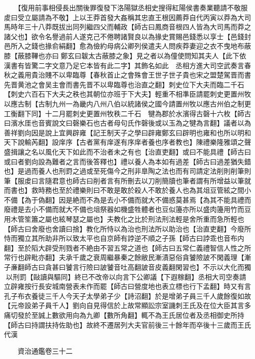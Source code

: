 　　【復用前事相侵長出關後罪復發下洛陽獄丞相史搜得紅陽侯書奏業聽請不敬服䖍曰受立屬請為不敬】上以王莽首發大姦稱其忠直王根因薦莽自代丙寅以莽為大司馬時年三十八莽既拔出同列繼四父而輔政【師古曰鳳商音根四人皆為大司馬而莽之諸父也】欲令名譽過前人遂克己不倦聘諸賢良以為掾史賞賜邑錢悉以享士【邑錢封邑所入之錢也掾俞絹翻】愈為儉約母病公卿列侯遣夫人問疾莽妻迎之衣不曳地布蔽膝【蔽膝鞸也亦曰鄭玄曰韍太古蔽膝之象】見之者以為僮使問知其夫人【此下依漢書有皆驚二字文意乃足它本皆有此二字】其飾名如此　丞相方進大司空武奏言春秋之義用貴治賤不以卑臨尊【春秋首止之會殊會王世子世子貴也宋之盟楚駕晋而書先晋黄池之會吴主會而書先晋不以卑臨尊也治直之翻】刺史位下大夫而臨二千石【刺史六百石下大夫之秩也其朝位亦班于下大夫】輕重不相準臣請罷刺史更置州牧以應古制【古制九州一為畿内八州八伯以統諸侯之國今請置州牧以應古州伯之制更工衡翻下同】十二月罷刺史更置州牧秩二千石　犍為郡於水濱得古磬十六枚【師古曰濱水厓也音賓說文曰磬樂石也古者母句氏作磬後或以玉為之犍為言翻】議者以為善祥劉向因是說上宜興辟雍【記王制天子之學曰辟雍鄭玄曰辟明也雍和也所以明和天下說輸芮翻】設庠序【古者黨有庠遂有序庠者養也序者教也】陳禮樂隆雅頌之聲盛揖讓之名以風化天下如此而不治者未之有也【治直吏翻】或曰不能具禮【師古曰或曰者劉向設為難者之言而後答釋也】禮以養人為本如有過差【師古曰過差猶失錯也】是過而養人也刑罸之過或至死傷今之刑非臯陶之法也而有司請定法削則削筆則筆【服䖍曰言隨君意也師古曰削者言有所刪去以刀削簡牘也筆者謂有所增益以筆就而書也】救時務也至於禮樂則曰不敢是敢於殺人不敢於養人也為其俎豆管絃之間小不備【為于偽翻】因是絶而不為是去小不備而就大不備惑莫甚焉【為其不能具禮而廢禮是去小不備而就大不備也俎祭器如機盛牲體者也豆似籩亦所以盛肉籩用竹而豆用木管笙簫之屬也絃琴瑟之屬也】夫教化之比於刑法刑法輕是舍所重而急所輕也【師古曰舍廢也舍讀曰捨】教化所恃以為治也刑法所以助治也【治直吏翻】今廢所恃而獨立其所助非所以致太平也自京師有誖逆不順之子孫【師古曰誖乖也音布内翻】至於䧟大辟受刑戮者不絶由不習五常之道也【師古曰五常仁義禮智信人性之所常行也辟毗亦翻】夫承千歲之衰周繼暴秦之餘敝民漸漬惡俗貪饕險詖不閑義理【漸子亷翻師古曰貪甚曰饕言行險曰詖饕音吐高翻詖音皮義翻閑習也】不示以大化而獨以刑罰【敺讀與驅同】終已不改帝以向言下公卿議【下遐稼翻】丞相大司空奏請立辟雍按行長安城南營表未作而罷【師古曰營度地也表立標也行下孟翻】時又有言孔子布衣養徒三千人今天子太學弟子少【詩沼翻】於是增弟子員三千人歲餘復如故【元帝設弟子員千人】劉向自見得信於上故常顯訟宗室譏刺王氏及在位大臣其言多痛切發於至誠上數欲用向為九卿【數所角翻】輒不為王氏居位者及丞相御史所持【師古曰持謂扶持佐助也】故終不遷居列大夫官前後三十餘年而卒後十三歲而王氏代漢

　　資治通鑑卷三十二  
    


 


